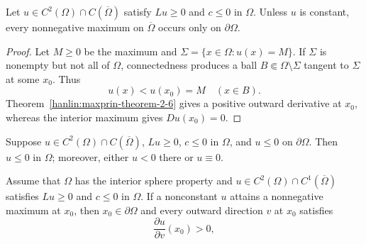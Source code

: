 \begin{theorem}\label{hanlin:maxprin-theorem-2-8}


Let $u\in C^2(\Omega)\cap C(\overline\Omega)$ satisfy $Lu\ge0$ and $c\le0$ in
$\Omega$. Unless $u$ is constant, every nonnegative maximum on
$\overline\Omega$ occurs only on $\partial\Omega$.
\end{theorem}
\begin{proof}
\sketch Let $M\ge0$ be the maximum and
$\Sigma=\{x\in\Omega:u(x)=M\}$. If $\Sigma$ is nonempty but not all of
$\Omega$, connectedness produces a ball $B\Subset\Omega\setminus\Sigma$ tangent
to $\Sigma$ at some $x_0$. Thus
\[
u(x)<u(x_0)=M\quad(x\in B).
\]
Theorem~\ref{hanlin:maxprin-theorem-2-6} gives a positive outward derivative at
$x_0$, whereas the interior maximum gives $Du(x_0)=0$.
\end{proof}

\begin{corollary}\label{hanlin:maxprin-cor-2-9}
Suppose $u\in C^2(\Omega)\cap C(\overline\Omega)$, $Lu\ge0$, $c\le0$ in
$\Omega$, and $u\le0$ on $\partial\Omega$. Then $u\le0$ in $\Omega$; moreover,
either $u<0$ there or $u\equiv0$.
\end{corollary}

\begin{corollary}\label{hanlin:maxprin-cor-2-10}
Assume that $\Omega$ has the interior sphere property and
$u\in C^2(\Omega)\cap C^1(\overline\Omega)$ satisfies $Lu\ge0$ and $c\le0$ in
$\Omega$. If a nonconstant $u$ attains a nonnegative maximum at $x_0$, then
$x_0\in\partial\Omega$ and every outward direction $v$ at $x_0$ satisfies
\[
\frac{\partial u}{\partial v}(x_0)>0,
\]
\end{corollary}

